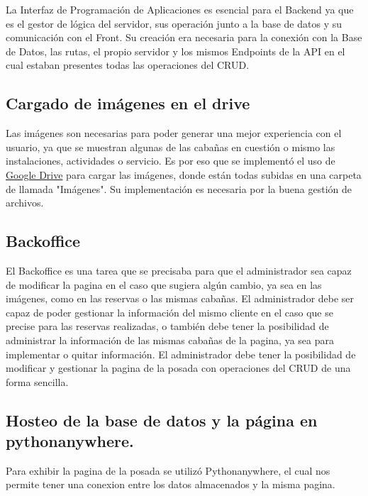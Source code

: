 La Interfaz de Programación de Aplicaciones es esencial para el Backend ya que es el gestor de lógica del servidor, sus operación junto a la base de datos y su comunicación con el Front. Su creación era necesaria para la conexión con la Base de Datos, las rutas, el propio servidor y los mismos Endpoints de la API en el cual estaban presentes todas las operaciones del CRUD.


\subsection{Cargado de imágenes en el drive}


Las imágenes son necesarias para poder generar una mejor experiencia con el usuario, ya que se muestran algunas de las cabañas en cuestión o mismo las instalaciones, actividades o servicio. Es por eso que se implementó el uso de \href{https://drive.google.com/drive/folders/1rzJS4rG295Mjmsm-0Xie7m3Bs8-YsvL0}{Google Drive} para cargar las imágenes, donde están todas subidas en una carpeta de llamada "Imágenes". Su implementación es necesaria por la buena gestión de archivos.


\subsection{Backoffice}

El Backoffice es una tarea que se precisaba para que el administrador sea capaz de modificar la pagina en el caso que sugiera algún cambio, ya sea en las imágenes, como en las reservas o las mismas cabañas. El administrador debe ser capaz de poder gestionar la información del mismo cliente en el caso que se precise para las reservas realizadas, o también debe tener la posibilidad de administrar la información de las mismas cabañas de la pagina, ya sea para implementar o quitar información. El administrador debe tener la posibilidad de modificar y gestionar la pagina de la posada con operaciones del CRUD de una forma sencilla.

\subsection{Hosteo de la base de datos y la página en pythonanywhere.}

Para exhibir la pagina de la posada se utilizó Pythonanywhere, el cual nos permite tener una conexion entre los datos almacenados y la misma pagina.
